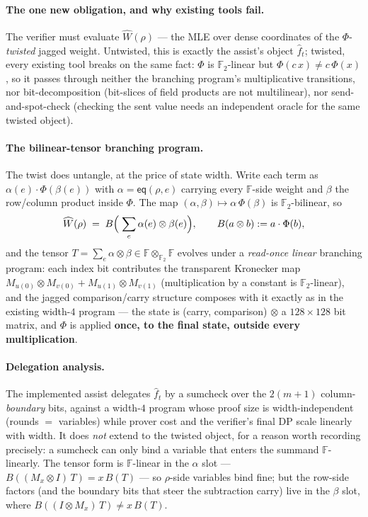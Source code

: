 \documentclass[11pt]{article}
\newcommand{\F}{\mathbb{F}}                       %
\newcommand{\eq}{\mathsf{eq}}
\theoremstyle{definition}
\begin{document}
\paragraph{The one new obligation, and why existing tools fail.} The
verifier must evaluate $\widehat W(\rho)$ --- the MLE over dense
coordinates of the $\Phi$-\emph{twisted} jagged weight. Untwisted, this
is exactly the assist's object $\hat f_t$; twisted, every existing tool
breaks on the same fact: $\Phi$ is $\F_2$-linear but
$\Phi(c\,x) \ne c\,\Phi(x)$, so it passes through neither the branching
program's multiplicative transitions, nor bit-decomposition (bit-slices
of field products are not multilinear), nor send-and-spot-check
(checking the sent value needs an independent oracle for the same
twisted object).

\paragraph{The bilinear-tensor branching program.} The twist does
untangle, at the price of state width. Write each term as
$\alpha(e)\cdot\Phi(\beta(e))$ with $\alpha = \eq(\rho, e)$ carrying
every $\F$-side weight and $\beta$ the row/column product inside
$\Phi$. The map $(\alpha, \beta) \mapsto \alpha\,\Phi(\beta)$ is
$\F_2$-bilinear, so
\[
  \widehat W(\rho) \;=\; B\Bigl(\;\sum_e \alpha(e) \otimes \beta(e)\Bigr),
  \qquad B(a \otimes b) := a\cdot\Phi(b),
\]
and the tensor $T = \sum_e \alpha \otimes \beta \in
\F \otimes_{\F_2} \F$ evolves under a \emph{read-once linear} branching
program: each index bit contributes the transparent Kronecker map
$M_{u(0)} {\otimes} M_{v(0)} + M_{u(1)} {\otimes} M_{v(1)}$
(multiplication by a constant is $\F_2$-linear), and the jagged
comparison/carry structure composes with it exactly as in the existing
width-$4$ program --- the state is (carry, comparison) $\otimes$ a
$128 \times 128$ bit matrix, and $\Phi$ is applied \textbf{once, to the
final state, outside every multiplication}.

\paragraph{Delegation analysis.} The implemented assist delegates
$\hat f_t$ by a sumcheck over the $2(m{+}1)$ column-\emph{boundary}
bits, against a width-$4$ program whose proof size is
width-independent (rounds $=$ variables) while prover cost and the
verifier's final DP scale linearly with width. It does \emph{not}
extend to the twisted object, for a reason worth recording precisely: a
sumcheck can only bind a variable that enters the summand
$\F$-linearly. The tensor form is $\F$-linear in the $\alpha$ slot ---
$B((M_x \otimes I)\,T) = x\,B(T)$ --- so $\rho$-side variables bind
fine; but the row-side factors (and the boundary bits that steer the
subtraction carry) live in the $\beta$ slot, where
$B((I \otimes M_x)\,T) \ne x\,B(T)$.
\end{document}
